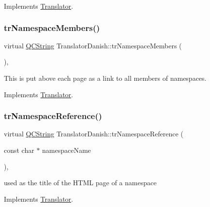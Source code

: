 Implements \mbox{\hyperlink{class_translator}{Translator}}.

\mbox{\label{class_translator_danish_a0db0ddb3dc7bc807afec5d0000fc6d09}} 
\subsubsection{\texorpdfstring{trNamespaceMembers()}{trNamespaceMembers()}}
{\footnotesize\ttfamily virtual \mbox{\hyperlink{class_q_c_string}{Q\+C\+String}} Translator\+Danish\+::tr\+Namespace\+Members (\begin{DoxyParamCaption}{ }\end{DoxyParamCaption})\hspace{0.3cm}{\ttfamily [inline]}, {\ttfamily [virtual]}}

This is put above each page as a link to all members of namespaces. 

Implements \mbox{\hyperlink{class_translator}{Translator}}.

\mbox{\label{class_translator_danish_a1838cbd784bbcddf40e81c1555d1644b}} 
\subsubsection{\texorpdfstring{trNamespaceReference()}{trNamespaceReference()}}
{\footnotesize\ttfamily virtual \mbox{\hyperlink{class_q_c_string}{Q\+C\+String}} Translator\+Danish\+::tr\+Namespace\+Reference (\begin{DoxyParamCaption}\item[{const char $\ast$}]{namespace\+Name }\end{DoxyParamCaption})\hspace{0.3cm}{\ttfamily [inline]}, {\ttfamily [virtual]}}

used as the title of the H\+T\+ML page of a namespace 

Implements \mbox{\hyperlink{class_translator}{Translator}}.

\mbox{\label{class_translator_danish_a3a6815f8ce55647c7dc89e09aca72175}} 
